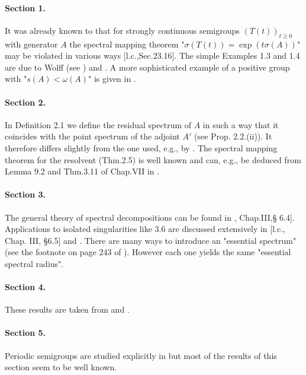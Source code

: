 \paragraph{Section 1.} It was already known to \citet{hillephillips:1957} that for strongly continuous semigroups $(T(t))_{t\geq 0}$ with generator $A$ the spectral mapping theorem "$\sigma(T(t)) = \exp(t\sigma(A))$" may be violated in various ways [l.c.,Sec.23.16].
The simple Examples 1.3 and 1.4 are due to Wolff (see \citet{greinervoigtwolff:1981}) and \citet{zabczyk:1975}.
A more sophisticated example of a positive group with "$s(A) < \omega(A)$" is given in \citet{wolff:1981}.

\paragraph{Section 2.} In Definition 2.1 we define the residual spectrum of $A$ in such a way that it coincides with the point spectrum of the adjoint $A'$ (see Prop. 2.2.(ii)).
It therefore differs slightly from the one used, e.g., by \citet{schaefer:1974}.
The spectral mapping theorem for the resolvent (Thm.2.5) is well known and can, e.g., be deduced from Lemma 9.2 and Thm.3.11 of Chap.VII in \citet{dunfordschwartz:1958}.

\paragraph{Section 3.} The general theory of spectral decompositions can be found in \citet{kato:1966}, Chap.III,§ 6.4].
Applications to isolated singularities like 3.6 are discussed extensively in [l.c., Chap. III, §6.5] and \citet[Chap.VIII, Sec.8]{yosida:1965}.
There are many ways to introduce an "essential spectrum" (see the footnote on page 243 of \citet{kato:1966}).
However each one yields the same "essential spectral radius".

\paragraph{Section 4.} These results are taken from \citet{derndinger:1980} and \citet{greiner:1981}.

\paragraph{Section 5.} Periodic semigroups are studied explicitly in \citet{bart:1977} but most of the results of this section seem to be well known.

